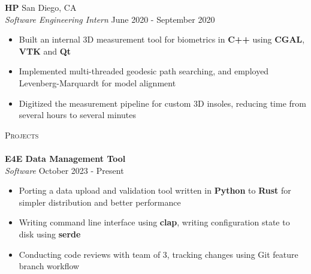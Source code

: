 \documentclass[a4paper]{article}
\newcommand{\lineunder} {
    \vspace*{-8pt} \\
    \hspace*{-18pt} \hrulefill \\
}
\newcommand{\header} [1] {
    {\hspace*{-18pt}\vspace*{6pt} \textsc{#1}}
    \vspace*{-6pt} \lineunder
}
\newenvironment{entry}[4][]{
  \textbf{#2} \hfill #1 \\
  \textit{#3} \hfill #4 \\
  \vspace{-2mm}
  \begin{itemize} \itemsep 0em
  }
  {
  \end{itemize}
}
\begin{document}
\begin{entry}[San Diego, CA]{HP}{Software Engineering Intern}{June 2020 -
    September 2020}
\item Built an internal 3D measurement tool for biometrics in \textbf{C++} using \textbf{CGAL}, \textbf{VTK} and \textbf{Qt}
\item Implemented multi-threaded geodesic path searching, and employed
  Levenberg-Marquardt for model alignment
\item Digitized the measurement pipeline for custom 3D insoles, reducing time from several hours to several minutes
\end{entry}


\header{Projects}
\vspace{1mm}
\begin{entry}{E4E Data Management Tool}{Software}{October 2023 - Present}
\item Porting a data upload and validation tool written in \textbf{Python} to \textbf{Rust} for simpler distribution and better performance
\item Writing command line interface using \textbf{clap}, writing configuration state to disk using \textbf{serde}
\item Conducting code reviews with team of 3, tracking changes using Git feature branch workflow
\end{entry}
\end{document}
